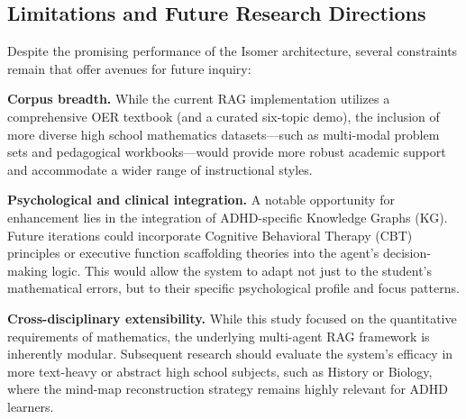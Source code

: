 \documentclass[sigplan,screen]{acmart}
\begin{document}
\subsection{Limitations and Future Research Directions}

Despite the promising performance of the Isomer architecture, several constraints remain that offer avenues for future inquiry:

\textbf{Corpus breadth.} While the current RAG implementation utilizes a comprehensive OER textbook (and a curated six-topic demo), the inclusion of more diverse high school mathematics datasets---such as multi-modal problem sets and pedagogical workbooks---would provide more robust academic support and accommodate a wider range of instructional styles.

\textbf{Psychological and clinical integration.} A notable opportunity for enhancement lies in the integration of ADHD-specific Knowledge Graphs (KG). Future iterations could incorporate Cognitive Behavioral Therapy (CBT) principles or executive function scaffolding theories into the agent's decision-making logic. This would allow the system to adapt not just to the student's mathematical errors, but to their specific psychological profile and focus patterns.

\textbf{Cross-disciplinary extensibility.} While this study focused on the quantitative requirements of mathematics, the underlying multi-agent RAG framework is inherently modular. Subsequent research should evaluate the system's efficacy in more text-heavy or abstract high school subjects, such as History or Biology, where the mind-map reconstruction strategy remains highly relevant for ADHD learners.



\end{document}

